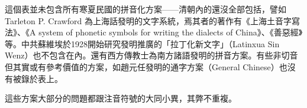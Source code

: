 \documentclass[a5paper, 12pt, openany]{book} %
\begin{document}
這個表並未包含所有寒夏民國的拼音化方案——清朝內的還沒全部包括，譬如Tarleton P. Crawford 為上海話發明的文字系統，焉其者的著作有《上海土音字寫法》、《A system of phonetic symbols for writing the dialects of China》、《善惡經》等。中共蘇維埃於1928開始研究發明推廣的「拉丁化新文字」（Latinxua Sin Wenz）也不包含在內。還有西方傳教士為南方諸語發明的拼音方案。有些非切音但其實或有參考價值的方案，如趙元任發明的通字方案（General Chinese）也沒有被錄於表上。

這些方案大部分的問題都跟注音符號的大同小異，其弊不重複。
\end{document}
